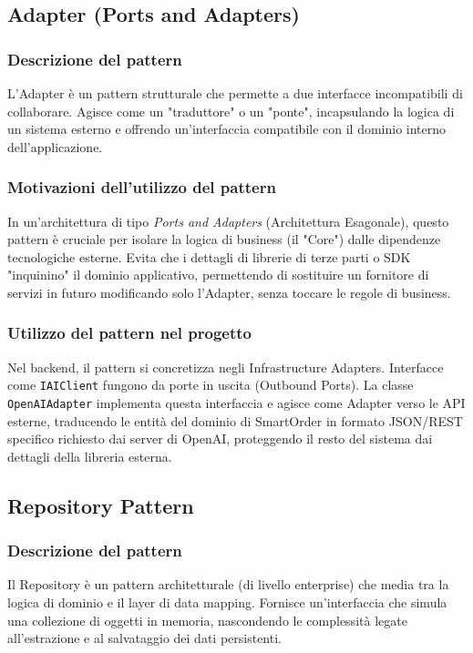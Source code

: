 \documentclass[a4paper, 11pt, oneside]{scrartcl}
\begin{document}
\subsection{Adapter (Ports and Adapters)}

\subsubsection{Descrizione del pattern}
L'Adapter è un pattern strutturale che permette a due interfacce incompatibili di collaborare. Agisce come un "traduttore" o un "ponte", incapsulando la logica di un sistema esterno e offrendo un'interfaccia compatibile con il dominio interno dell'applicazione.

\subsubsection{Motivazioni dell'utilizzo del pattern}
In un'architettura di tipo \textit{Ports and Adapters} (Architettura Esagonale), questo pattern è cruciale per isolare la logica di business (il "Core") dalle dipendenze tecnologiche esterne. Evita che i dettagli di librerie di terze parti o SDK "inquinino" il dominio applicativo, permettendo di sostituire un fornitore di servizi in futuro modificando solo l'Adapter, senza toccare le regole di business.

\subsubsection{Utilizzo del pattern nel progetto}
Nel backend, il pattern si concretizza negli Infrastructure Adapters. Interfacce come \texttt{IAIClient} fungono da porte in uscita (Outbound Ports). La classe \texttt{OpenAIAdapter} implementa questa interfaccia e agisce come Adapter verso le API esterne, traducendo le entità del dominio di SmartOrder in formato JSON/REST specifico richiesto dai server di OpenAI, proteggendo il resto del sistema dai dettagli della libreria esterna.

\subsection{Repository Pattern}

\subsubsection{Descrizione del pattern}
Il Repository è un pattern architetturale (di livello enterprise) che media tra la logica di dominio e il layer di data mapping. Fornisce un'interfaccia che simula una collezione di oggetti in memoria, nascondendo le complessità legate all'estrazione e al salvataggio dei dati persistenti.
\end{document}
